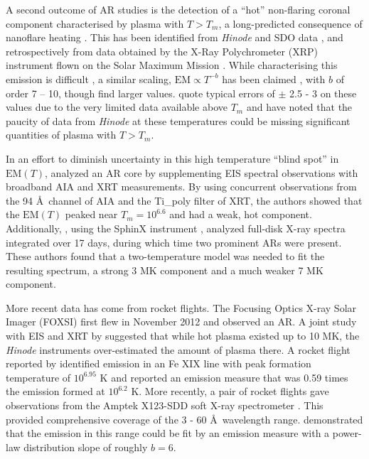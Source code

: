 \documentclass[]{aastex}
\newcommand{\ang}{\AA~}
\begin{document}
%
	\par A second outcome of AR studies is the detection of a ``hot'' non-flaring coronal component characterised by plasma with $T > T_m$, a long-predicted consequence of nanoflare heating \citep{cargill_implications_1994,cargill_diagnostics_1995}. This has been identified from \textit{Hinode} and SDO data \citep{reale_evidence_2009,schmelz_hinode_2009,testa_hinode/eis_2012}, and retrospectively from data obtained by the X-Ray Polychrometer (XRP) instrument flown on the Solar Maximum Mission \citep{del_zanna_elemental_2014}. While characterising this emission is difficult \citep[e.g.][]{testa_temperature_2011,winebarger_defining_2012}, a similar scaling, $\mathrm{EM} \propto T^{-b}$ has been claimed \citep[e.g.][]{warren_systematic_2012}, with $b$ of order 7 – 10, though \citeauthor{del_zanna_elemental_2014} find larger values. \citeauthor{warren_systematic_2012} quote typical errors of $\pm$ 2.5 - 3 on these values due to the very limited data available above $T_m$ and \citeauthor{winebarger_defining_2012} have noted that the paucity of data from \textit{Hinode} at these temperatures could be missing significant quantities of plasma with $T > T_m$.
	\par In an effort to diminish uncertainty in this high temperature ``blind spot'' in $\mathrm{EM}(T)$, \citet{petralia_thermal_2014} analyzed an AR core by supplementing EIS spectral observations with broadband AIA and XRT measurements. By using concurrent observations from the 94 \ang channel of AIA and the Ti\_poly filter of XRT, the authors showed that the $\mathrm{EM}(T)$ peaked near $T_m = 10^{6.6}$ and had a weak, hot component. Additionally, \citet{miceli_x-ray_2012}, using the SphinX instrument \citep{sylwester_sphinx:_2008,gburek_sphinx_2011}, analyzed full-disk X-ray spectra integrated over 17 days, during which time two prominent ARs were present. These authors found that a two-temperature model was needed to fit the resulting spectrum, a strong 3 MK component and a much weaker 7 MK component.
%
	\par More recent data has come from rocket flights. The Focusing Optics X-ray Solar Imager (FOXSI) \citep{krucker_focusing_2013} first flew in November 2012 and observed an AR. A joint study with EIS and XRT by \citet{ishikawa_constraining_2014} suggested that while hot plasma existed up to 10 MK, the \textit{Hinode} instruments over-estimated the amount of plasma there. A rocket flight reported by \citet{brosius_pervasive_2014} identified emission in an Fe XIX line with peak formation temperature of $10^{6.95}$ K and reported an emission measure that was 0.59 times the emission formed at $10^{6.2}$ K. More recently, a pair of rocket flights gave observations from the Amptek X123-SDD soft X-ray spectrometer \citep{caspi_new_2015}. This provided comprehensive coverage of the 3 - 60 \ang wavelength range. \citeauthor{caspi_new_2015} demonstrated that the emission in this range could be fit by an emission measure with a power-law distribution slope of roughly $b = 6$. 
\end{document}
